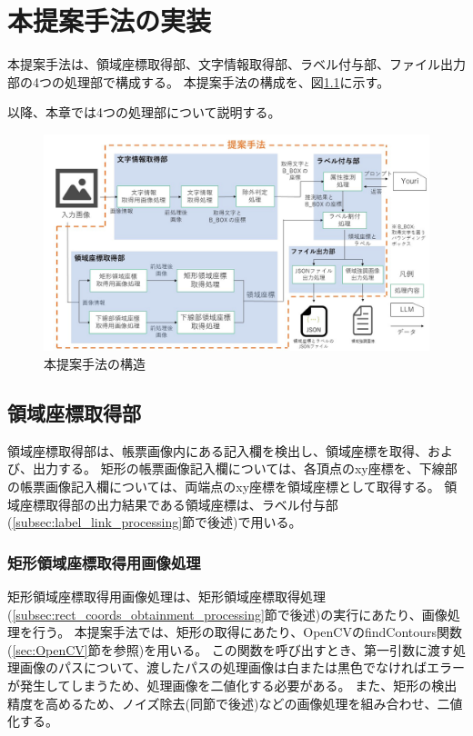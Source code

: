 \chapter{本提案手法の実装}\label{cha:Implementation}
本提案手法は、領域座標取得部、文字情報取得部、ラベル付与部、ファイル出力部の4つの処理部で構成する。
本提案手法の構成を、図\ref{fig:structure}に示す。

以降、本章では4つの処理部について説明する。

\begin{figure}[t]
    \begin{center}
        \includegraphics[width=15cm]{image/04-implementation/structure.jpg}
        \caption{本提案手法の構造}
        \label{fig:structure}
    \end{center}
\end{figure}


\section{領域座標取得部}\label{sec:area_coords_obtainment_part}
領域座標取得部は、帳票画像内にある記入欄を検出し、領域座標を取得、および、出力する。
矩形の帳票画像記入欄については、各頂点のxy座標を、下線部の帳票画像記入欄については、両端点のxy座標を領域座標として取得する。
領域座標取得部の出力結果である領域座標は、ラベル付与部(\ref{subsec:label_link_processing}節で後述)で用いる。

\subsection{矩形領域座標取得用画像処理}\label{subsec:image_processing_for_rect_coords_obtainment}
矩形領域座標取得用画像処理は、矩形領域座標取得処理(\ref{subsec:rect_coords_obtainment_processing}節で後述)の実行にあたり、画像処理を行う。
本提案手法では、矩形の取得にあたり、OpenCVのfindContours関数(\ref{sec:OpenCV}節を参照)を用いる。
この関数を呼び出すとき、第一引数に渡す処理画像のパスについて、渡したパスの処理画像は白または黒色でなければエラーが発生してしまうため、処理画像を二値化する必要がある。
また、矩形の検出精度を高めるため、ノイズ除去(同節で後述)などの画像処理を組み合わせ、二値化する。

